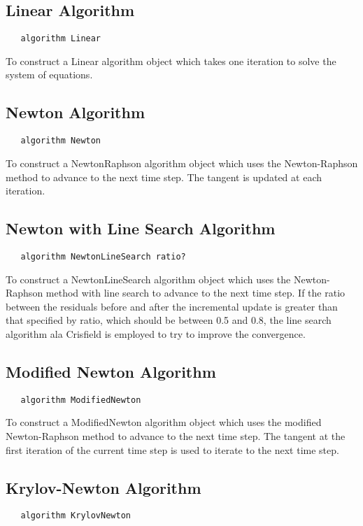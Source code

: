 \documentclass[12pt]{article}
\begin{document}
\subsection {Linear Algorithm}
{\sf\small
\begin{verbatim}
   algorithm Linear
\end{verbatim}
}

To construct a Linear algorithm object which takes one iteration to solve
the system of equations.

\subsection {Newton Algorithm}
{\sf\small
\begin{verbatim}
   algorithm Newton
\end{verbatim}
}

To construct a NewtonRaphson algorithm object which uses the Newton-Raphson
method to advance to the next time step. The tangent is updated at
each iteration.


\subsection {Newton with Line Search Algorithm}
{\sf\small
\begin{verbatim}
   algorithm NewtonLineSearch ratio?
\end{verbatim}
}

To construct a NewtonLineSearch algorithm object which uses the Newton-Raphson
method with line search to advance to the next time step. If the
ratio between the residuals before and after the incremental update
is greater than that specified by ratio, which should be between 0.5
and 0.8, the line search algorithm ala Crisfield is employed to try
to improve the convergence. 

\subsection {Modified Newton Algorithm}
{\sf\small
\begin{verbatim}
   algorithm ModifiedNewton
\end{verbatim}
}

To construct a ModifiedNewton algorithm object which uses the modified Newton-Raphson
method to advance to the next time step. The tangent at the first iteration of the current
time step is used to iterate to the next time step.

\subsection {Krylov-Newton Algorithm}
{\sf\small
\begin{verbatim}
   algorithm KrylovNewton
\end{verbatim}
}
\end{document}
